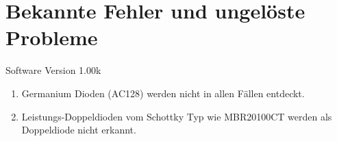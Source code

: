 
\chapter{Bekannte Fehler und ungel\"oste Probleme}
{\center Software Version 1.00k}

\begin{enumerate}

\item Germanium Dioden (AC128) werden nicht in allen F\"allen entdeckt.
\item Leistungs-Doppeldioden vom Schottky Typ wie MBR20100CT werden als Doppeldiode nicht erkannt.

\end{enumerate}

